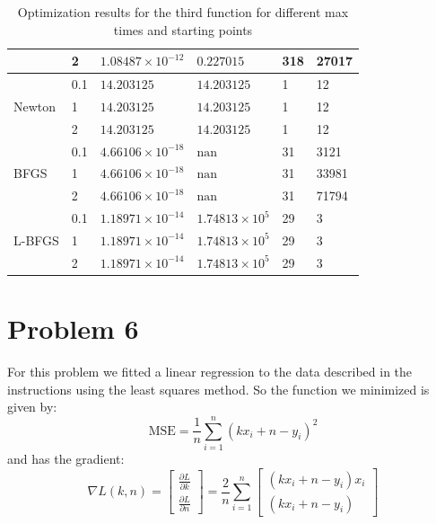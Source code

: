 \documentclass[9pt]{IEEEtran}
\begin{document}
\begin{table}[h!]
\begin{tabular}{|p{1cm}|p{1.9cm}|p{1.2cm}|p{1.2cm}|p{0.7cm}|p{0.7cm}|}
                                         & 2     & $1.08487\times10^{-12}$  & $0.227015$           & 318    & 27017 \\ \hline
        \multirow{3}{*}{Newton} 
                                         & 0.1   & $14.203125$              & $14.203125$          & 1      & 12 \\ \cline{2-6} 
                                         & 1     & $14.203125$              & $14.203125$          & 1      & 12 \\ \cline{2-6} 
                                         & 2     & $14.203125$              & $14.203125$          & 1      & 12 \\ \hline
        \multirow{3}{*}{BFGS} 
                                         & 0.1   & $4.66106\times10^{-18}$  & $\text{nan}$          & 31     & 3121 \\ \cline{2-6} 
                                         & 1     & $4.66106\times10^{-18}$  & $\text{nan}$          & 31     & 33981 \\ \cline{2-6} 
                                         & 2     & $4.66106\times10^{-18}$  & $\text{nan}$          & 31     & 71794 \\ \hline
        \multirow{3}{*}{L-BFGS} 
                                         & 0.1   & $1.18971\times10^{-14}$  & $1.74813\times10^{5}$  & 29     & 3 \\ \cline{2-6} 
                                         & 1     & $1.18971\times10^{-14}$  & $1.74813\times10^{5}$  & 29     & 3 \\ \cline{2-6} 
                                         & 2     & $1.18971\times10^{-14}$  & $1.74813\times10^{5}$  & 29     & 3 \\ \hline
    \end{tabular}
    \caption{Optimization results for the third function for different
    max times and starting points}
    \label{tab:f3_optimization}
\end{table}

\clearpage
\section{Problem 6}
For this problem we fitted a linear regression to the data described in the 
instructions using the least squares method. So the function we minimized is given by:
\[
\text{MSE} = \frac{1}{n} \sum_{i=1}^{n} \left( k x_i + n - y_i \right)^2
\]
and has the gradient:
\[
\nabla L(k, n) = 
\begin{bmatrix}
\frac{\partial L}{\partial k} \\
\frac{\partial L}{\partial n}
\end{bmatrix}
=
\frac{2}{n} \sum_{i=1}^{n}
\begin{bmatrix}
(k x_i + n - y_i) x_i \\
(k x_i + n - y_i)
\end{bmatrix}
\]
\end{document}
